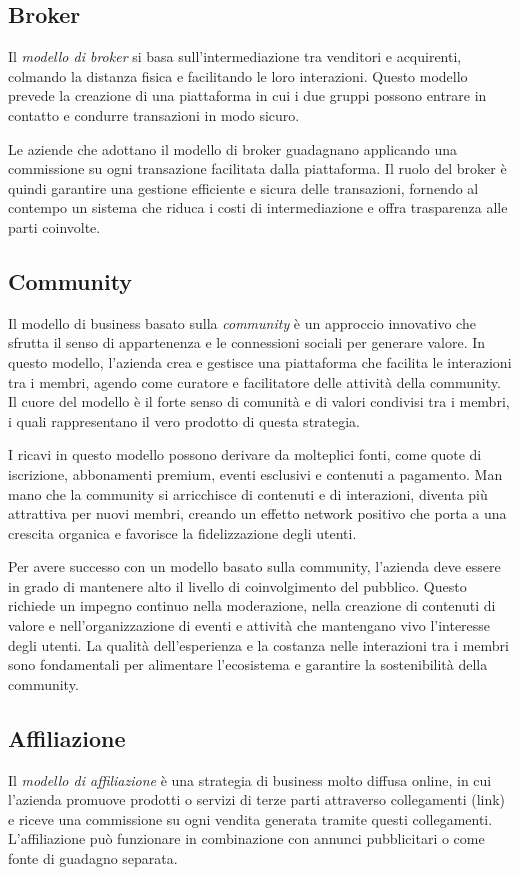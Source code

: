\subsection*{Broker}
Il \textit{modello di broker} si basa sull’intermediazione tra venditori e acquirenti, colmando la distanza fisica e facilitando le loro interazioni. Questo modello prevede la creazione di una piattaforma in cui i due gruppi possono entrare in contatto e condurre transazioni in modo sicuro.

Le aziende che adottano il modello di broker guadagnano applicando una commissione su ogni transazione facilitata dalla piattaforma. Il ruolo del broker è quindi garantire una gestione efficiente e sicura delle transazioni, fornendo al contempo un sistema che riduca i costi di intermediazione e offra trasparenza alle parti coinvolte.

\subsection*{Community}
Il modello di business basato sulla \textit{community} è un approccio innovativo che sfrutta il senso di appartenenza e le connessioni sociali per generare valore. In questo modello, l’azienda crea e gestisce una piattaforma che facilita le interazioni tra i membri, agendo come curatore e facilitatore delle attività della community. Il cuore del modello è il forte senso di comunità e di valori condivisi tra i membri, i quali rappresentano il vero prodotto di questa strategia.

I ricavi in questo modello possono derivare da molteplici fonti, come quote di iscrizione, abbonamenti premium, eventi esclusivi e contenuti a pagamento. Man mano che la community si arricchisce di contenuti e di interazioni, diventa più attrattiva per nuovi membri, creando un effetto network positivo che porta a una crescita organica e favorisce la fidelizzazione degli utenti.

Per avere successo con un modello basato sulla community, l’azienda deve essere in grado di mantenere alto il livello di coinvolgimento del pubblico. Questo richiede un impegno continuo nella moderazione, nella creazione di contenuti di valore e nell’organizzazione di eventi e attività che mantengano vivo l’interesse degli utenti. La qualità dell’esperienza e la costanza nelle interazioni tra i membri sono fondamentali per alimentare l’ecosistema e garantire la sostenibilità della community.

\subsection*{Affiliazione}
Il \textit{modello di affiliazione} è una strategia di business molto diffusa online, in cui l’azienda promuove prodotti o servizi di terze parti attraverso collegamenti (link) e riceve una commissione su ogni vendita generata tramite questi collegamenti. L’affiliazione può funzionare in combinazione con annunci pubblicitari o come fonte di guadagno separata.

